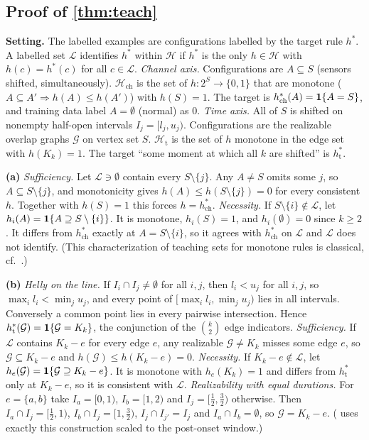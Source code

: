 \subsection{Proof of \texorpdfstring{\cref{thm:teach}}{Theorem 6}}
\textbf{Setting.} The labelled examples are configurations labelled by the target rule $h^*$. A labelled set $\mathcal L$ identifies $h^*$ within $\mathcal H$ if $h^*$ is the only $h\in\mathcal H$ with $h(c)=h^*(c)$ for all $c\in\mathcal L$. \emph{Channel axis.} Configurations are $A\subseteq S$ (sensors shifted, simultaneously). $\mathcal H_{\mathrm{ch}}$ is the set of $h:2^S\to\{0,1\}$ that are monotone ($A\subseteq A'\Rightarrow h(A)\le h(A')$) with $h(S)=1$. The target is $h^*_{\mathrm{ch}}(A)=\mathbf{1}\{A=S\}$, and training data label $A=\emptyset$ (normal) as $0$. \emph{Time axis.} All of $S$ is shifted on nonempty half-open intervals $I_j=[l_j,u_j)$. Configurations are the realizable overlap graphs $\mathcal G$ on vertex set $S$. $\mathcal H_{\mathrm t}$ is the set of $h$ monotone in the edge set with $h(K_k)=1$. The target ``some moment at which all $k$ are shifted'' is $h^*_{\mathrm t}$.

\textbf{(a)} \emph{Sufficiency.} Let $\mathcal L\ni\emptyset$ contain every $S\setminus\{j\}$. Any $A\ne S$ omits some $j$, so $A\subseteq S\setminus\{j\}$, and monotonicity gives $h(A)\le h(S\setminus\{j\})=0$ for every consistent $h$. Together with $h(S)=1$ this forces $h=h^*_{\mathrm{ch}}$. \emph{Necessity.} If $S\setminus\{i\}\notin\mathcal L$, let $h_i(A)=\mathbf{1}\{A\supseteq S\setminus\{i\}\}$. It is monotone, $h_i(S)=1$, and $h_i(\emptyset)=0$ since $k\ge2$. It differs from $h^*_{\mathrm{ch}}$ exactly at $A=S\setminus\{i\}$, so it agrees with $h^*_{\mathrm{ch}}$ on $\mathcal L$ and $\mathcal L$ does not identify. (This characterization of teaching sets for monotone rules is classical, cf.\ \citealp{goldman1995}.)

\textbf{(b)} \emph{Helly on the line.} If $I_i\cap I_j\ne\emptyset$ for all $i,j$, then $l_i<u_j$ for all $i,j$, so $\max_il_i<\min_ju_j$, and every point of $[\max_il_i,\min_ju_j)$ lies in all intervals. Conversely a common point lies in every pairwise intersection. Hence $h^*_{\mathrm t}(\mathcal G)=\mathbf{1}\{\mathcal G=K_k\}$, the conjunction of the $\binom k2$ edge indicators. \emph{Sufficiency.} If $\mathcal L$ contains $K_k-e$ for every edge $e$, any realizable $\mathcal G\ne K_k$ misses some edge $e$, so $\mathcal G\subseteq K_k-e$ and $h(\mathcal G)\le h(K_k-e)=0$. \emph{Necessity.} If $K_k-e\notin\mathcal L$, let $h_e(\mathcal G)=\mathbf{1}\{\mathcal G\supseteq K_k-e\}$. It is monotone with $h_e(K_k)=1$ and differs from $h^*_{\mathrm t}$ only at $K_k-e$, so it is consistent with $\mathcal L$. \emph{Realizability with equal durations.} For $e=\{a,b\}$ take $I_a=[0,1)$, $I_b=[1,2)$ and $I_j=[\frac12,\frac32)$ otherwise. Then $I_a\cap I_j=[\frac12,1)$, $I_b\cap I_j=[1,\frac32)$, $I_j\cap I_{j'}=I_j$ and $I_a\cap I_b=\emptyset$, so $\mathcal G=K_k-e$. ( uses exactly this construction scaled to the post-onset window.)

